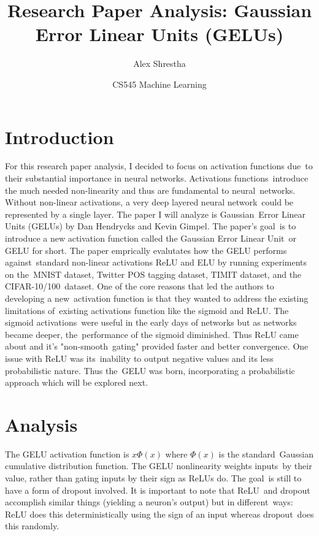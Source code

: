 \documentclass[12pt]{article}
\title{Research Paper Analysis: Gaussian Error Linear Units (GELUs)}
\author{Alex Shrestha}
\date{CS545 Machine Learning }
\begin{document}
\maketitle

\section{Introduction}
For this research paper analysis, I decided to focus on activation functions due\
to their substantial importance in neural networks. Activations functions\ 
introduce the much needed non-linearity and thus are fundamental to neural\
networks. Without non-linear activations, a very deep layered neural network\
could be represented by a single layer. The paper I will analyze is Gaussian\
Error Linear Units (GELUs)\cite{DBLP:journals/corr/HendrycksG16} by Dan Hendrycks and Kevin Gimpel. 
The paper's goal\
is to introduce a new activation function called the Gaussian Error Linear Unit\
or GELU for short. The paper emprically evalutates how the GELU performs against\
standard non-linear activations ReLU and ELU by running experiments on the\
MNIST dataset, Twitter POS tagging dataset, TIMIT dataset, and the CIFAR-10/100\
dataset. One of the core reasons that led the authors to developing a new\
activation function is that they wanted to address the existing limitations of\
existing activations function like the sigmoid and ReLU. The sigmoid activations\
were useful in the early days of networks but as networks became deeper, the\
performance of the sigmoid diminished. Thus ReLU came about and it's "non-smooth\
gating" provided faster and better convergence. One issue with ReLU was its\
inability to output negative values and its less probabilistic nature. Thus the\
GELU was born, incorporating a probabilistic approach which will be explored next.

\section{Analysis}
The GELU activation function is \( x \Phi(x) \) where $\Phi(x)$ is the standard\
Gaussian cumulative distribution function. The GELU nonlinearity weights inputs\
by their value, rather than gating inputs by their sign as ReLUs do. The goal\
is still to have a form of dropout involved. It is important to note that ReLU\
and dropout accomplish similar things (yielding a neuron's output) but in different\
ways: ReLU does this deterministically using the sign of an input whereas dropout\
does this randomly.
\end{document}
